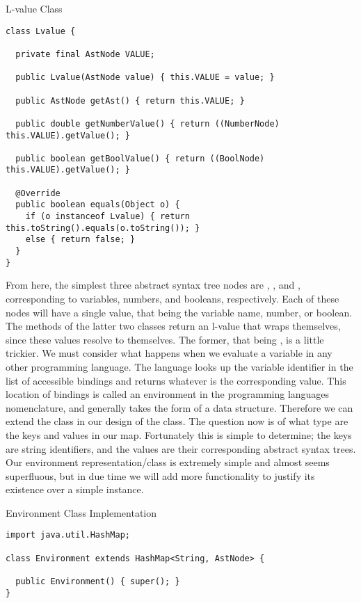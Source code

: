\begin{cl}{L-value Class}
\begin{lstlisting}[language=MyJava]
class Lvalue {

  private final AstNode VALUE;

  public Lvalue(AstNode value) { this.VALUE = value; }

  public AstNode getAst() { return this.VALUE; }

  public double getNumberValue() { return ((NumberNode) this.VALUE).getValue(); }

  public boolean getBoolValue() { return ((BoolNode) this.VALUE).getValue(); }

  @Override
  public boolean equals(Object o) {
    if (o instanceof Lvalue) { return this.toString().equals(o.toString()); } 
    else { return false; }
  }
}
\end{lstlisting}
\end{cl}

From here, the simplest three abstract syntax tree nodes are , , and , corresponding to variables, numbers, and booleans, respectively. Each of these nodes will have a single value, that being the variable name, number, or boolean. The  methods of the latter two classes return an l-value that wraps themselves, since these values resolve to themselves. The former, that being , is a little trickier. We must consider what happens when we evaluate a variable in any other programming language. The language looks up the variable identifier in the list of accessible bindings and returns whatever is the corresponding value. This location of bindings is called an environment in the programming languages nomenclature, and generally takes the form of a  data structure. Therefore we can extend the  class in our design of the  class. The question now is of what type are the keys and values in our map. Fortunately this is simple to determine; the keys are string identifiers, and the values are their corresponding abstract syntax trees. Our environment representation/class is extremely simple and almost seems superfluous, but in due time we will add more functionality to justify its existence over a simple  instance.

\begin{cl}{Environment Class Implementation}
\begin{lstlisting}[language=MyJava]
import java.util.HashMap;

class Environment extends HashMap<String, AstNode> {
  
  public Environment() { super(); }
}
\end{lstlisting}
\end{cl}

